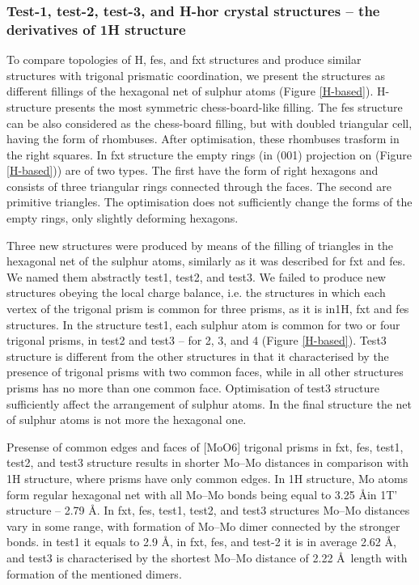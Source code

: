 \documentclass[a4paperm]{article}
\begin{document}
\subsubsection{Test-1, test-2, test-3, and H-hor crystal structures – the derivatives of 1H structure}

To compare topologies of H, fes, and fxt structures and produce similar structures with trigonal prismatic coordination, we present the structures as different fillings of the hexagonal net of sulphur atoms (Figure \ref{H-based}).
H-structure presents the most symmetric chess-board-like filling.
The fes structure can be also considered as the chess-board filling, but with doubled triangular cell, having the form of rhombuses.
After optimisation, these rhombuses trasform in the right squares.
In fxt structure the empty rings (in (001) projection on  (Figure \ref{H-based})) are of two types.
The first have the form of right hexagons and consists of three triangular rings connected through the faces.
The second are primitive triangles.
The optimisation does not sufficiently change the forms of the empty rings, only slightly deforming hexagons.


Three new structures were produced by means of the filling of triangles in the hexagonal net of the sulphur atoms, similarly as it was described for fxt and fes.
We named them abstractly test1, test2, and test3.
We failed to produce new structures obeying the local charge balance, i.e. the structures in which each vertex of the trigonal prism is common for three prisms, as it is in1H, fxt and fes structures.
In the structure test1, each sulphur atom is common for two or four trigonal prisms, in test2 and test3 – for 2, 3, and 4 (Figure \ref{H-based}).
Test3 structure is different from the other structures in that it characterised by the presence of trigonal prisms with two common faces, while in all other structures prisms has no more than one common face.
Optimisation of test3 structure sufficiently affect the arrangement of sulphur atoms.
In the final structure the net of sulphur atoms is not more the hexagonal one.

Presense of common edges and faces of [MoO6] trigonal prisms in fxt, fes, test1, test2, and test3 structure results in shorter Mo--Mo distances in comparison with 1H structure, where prisms have only common edges.
In 1H structure, Mo atoms form regular hexagonal net with all Mo--Mo bonds being equal to 3.25 \AA in 1T' structure -- 2.79 \AA.
In fxt, fes, test1, test2, and test3 structures Mo--Mo distances vary in some range, with formation of Mo--Mo dimer connected by the stronger bonds.
in test1 it equals to 2.9 \AA, in fxt, fes, and test-2 it is in average 2.62 \AA, and test3 is characterised by the shortest Mo--Mo distance of 2.22 \AA\ length with formation of the mentioned dimers.
\end{document}
